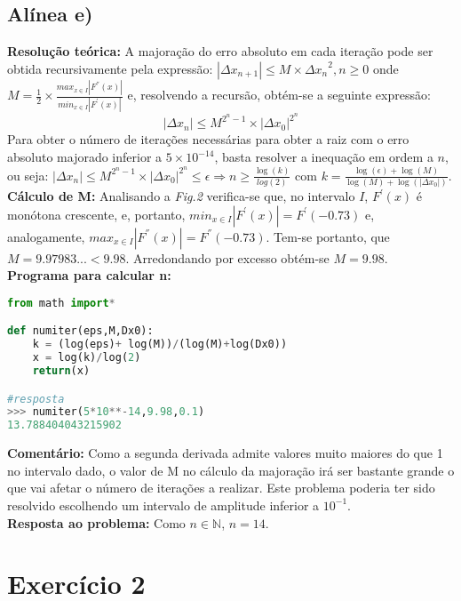 \documentclass{article}
\begin{document}
\subsection*{Alínea e)}
\textbf{Resolução teórica: }A majoração do erro absoluto em cada iteração pode ser obtida recursivamente pela expressão:
$|\Delta x_{n+1}| \leq  M \times {\Delta x_n}^2  ,n \geq 0$ onde $M = \frac{1}{2}\times \frac{max_{x \in I} |F^{''}(x)|}{min_{x \in I}|F^{'}(x)|}$ e, resolvendo a recursão, obtém-se a seguinte expressão:
 $$|\Delta x_n| \leq M^{2^n-1}\times |\Delta x_0|^{2^n}$$
Para obter o número de iterações necessárias para obter a raiz com o erro absoluto majorado inferior a $5\times 10^{-14}$, basta resolver a inequação em ordem a $n$, ou seja: $ |\Delta x_n| \leq M^{2^n-1}\times |\Delta x_0|^{2^n} \leq \epsilon \Rightarrow n \geq \frac{\log(k)}{log(2)}$ com $ k = \frac{\log(\epsilon)+\log(M)}{\log(M)+\log(|\Delta x_0|)}$.\\[5mm]
\textbf{Cálculo de M:} Analisando a \textit{Fig.2} verifica-se que, no intervalo $I$, $F^{'}(x)$ é monótona crescente, e, portanto, $ min_{x \in I}|F^{'}(x)| = F^{'}(-0.73) $ e, analogamente, $ max_{x \in I} |F^{''}(x)| = F^{''}(-0.73)$. Tem-se portanto, que $ M = 9.97983...<9.98 $. Arredondando por excesso obtém-se $ M = 9.98$.\\[5mm]
\textbf{Programa para calcular n:}
\begin{lstlisting}[language=Python]
from math import*

def numiter(eps,M,Dx0):
    k = (log(eps)+ log(M))/(log(M)+log(Dx0))
    x = log(k)/log(2)
    return(x)

#resposta
>>> numiter(5*10**-14,9.98,0.1)
13.788404043215902


\end{lstlisting}
\textbf{Comentário: }Como a segunda derivada admite valores muito maiores do que 1 no intervalo dado, o valor de M no cálculo da majoração irá ser bastante grande o que vai afetar o número de iterações a realizar. Este problema poderia ter sido resolvido escolhendo um intervalo de amplitude inferior a $10^{-1}$.\\
\textbf{Resposta ao problema:} Como $ n\in \mathbb{N}$, $ n=14 $.
\section*{Exercício 2}
\end{document}
